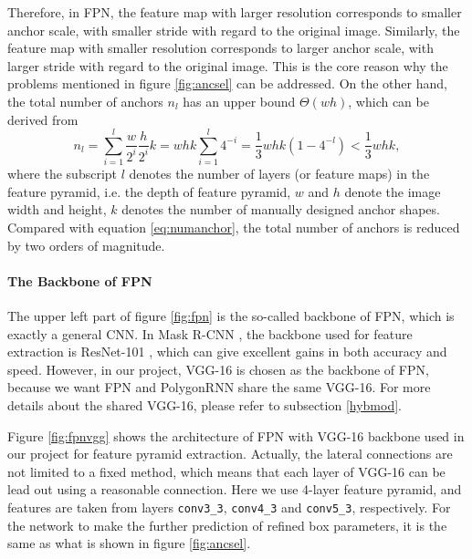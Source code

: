 

Therefore, in FPN, the feature map with larger resolution corresponds to smaller anchor scale, with smaller stride with regard to the original image. Similarly, the feature map with smaller resolution corresponds to larger anchor scale, with larger stride with regard to the original image. This is the core reason why the problems mentioned in figure \ref{fig:ancsel} can be addressed. On the other hand, the total number of anchors $n_l$ has an upper bound $\Theta(wh)$, which can be derived from
\begin{equation}
	n_l = \sum_{i=1}^{l}\frac{w}{2^i}\frac{h}{2^i}k=whk\sum_{i=1}^{l}4^{-i}=\frac{1}{3}whk(1-4^{-l}) < \frac{1}{3}whk,
\end{equation}
where the subscript $l$ denotes the number of layers (or feature maps) in the feature pyramid, i.e. the depth of feature pyramid, $w$ and $h$ denote the image width and height, $k$ denotes the number of manually designed anchor shapes. Compared with equation \ref{eq:numanchor}, the total number of anchors is reduced by two orders of magnitude.

\paragraph{The Backbone of FPN}
The upper left part of figure \ref{fig:fpn} is the so-called backbone of FPN, which is exactly a general CNN. In Mask R-CNN \cite{maskrcnn}, the backbone used for feature extraction is ResNet-101 \cite{resnet}, which can give excellent gains in both accuracy and speed. However, in our project, VGG-16 \cite{vgg16} is chosen as the backbone of FPN, because we want FPN and PolygonRNN share the same VGG-16. For more details about the shared VGG-16, please refer to subsection \ref{hybmod}.

Figure \ref{fig:fpnvgg} shows the architecture of FPN with VGG-16 backbone used in our project for feature pyramid extraction. Actually, the lateral connections are not limited to a fixed method, which means that each layer of VGG-16 can be lead out using a reasonable connection. Here we use 4-layer feature pyramid, and features are taken from layers \lstinline{conv3_3}, \lstinline{conv4_3} and \lstinline{conv5_3}, respectively. For the network to make the further prediction of refined box parameters, it is the same as what is shown in figure \ref{fig:ancsel}.



\section{\modelnameshort}\label{modmer}

